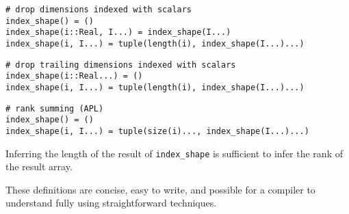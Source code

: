 
\begin{verbatim}
# drop dimensions indexed with scalars
index_shape() = ()
index_shape(i::Real, I...) = index_shape(I...)
index_shape(i, I...) = tuple(length(i), index_shape(I...)...)
\end{verbatim}

\begin{verbatim}
# drop trailing dimensions indexed with scalars
index_shape(i::Real...) = ()
index_shape(i, I...) = tuple(length(i), index_shape(I...)...)
\end{verbatim}

\begin{verbatim}
# rank summing (APL)
index_shape() = ()
index_shape(i, I...) = tuple(size(i)..., index_shape(I...)...)
\end{verbatim}

Inferring the length of the result of \texttt{index\_shape} is sufficient
to infer the rank of the result array.

These definitions are concise, easy to write, and possible for a
compiler to understand fully using straightforward techniques.










